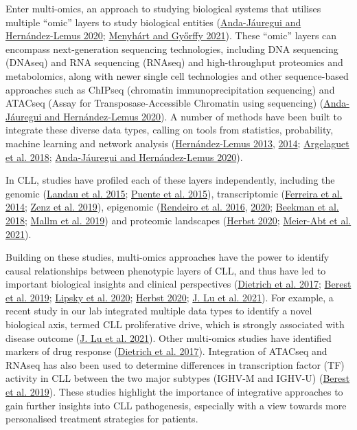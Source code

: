 \documentclass[11pt, a4paper, twosided]{book}
\begin{document}
Enter multi-omics, an approach to studying biological systems that utilises multiple ``omic'' layers to study biological entities (\protect\hyperlink{ref-Anda2020}{Anda-Jáuregui and Hernández-Lemus 2020}; \protect\hyperlink{ref-Menyhart2021}{Menyhárt and Győrffy 2021}). These ``omic'' layers can encompass next-generation sequencing technologies, including DNA sequencing (DNAseq) and RNA sequencing (RNAseq) and high-throughput proteomics and metabolomics, along with newer single cell technologies and other sequence-based approaches such as ChIPseq (chromatin immunoprecipitation sequencing) and ATACseq (Assay for Transposase-Accessible Chromatin using sequencing) (\protect\hyperlink{ref-Anda2020}{Anda-Jáuregui and Hernández-Lemus 2020}). A number of methods have been built to integrate these diverse data types, calling on tools from statistics, probability, machine learning and network analysis (\protect\hyperlink{ref-Hernandez2013}{Hernández-Lemus 2013}, \protect\hyperlink{ref-Hernandez2014}{2014}; \protect\hyperlink{ref-Argelaguet2018}{Argelaguet et al. 2018}; \protect\hyperlink{ref-Anda2020}{Anda-Jáuregui and Hernández-Lemus 2020}).

In CLL, studies have profiled each of these layers independently, including the genomic (\protect\hyperlink{ref-Landau2015}{Landau et al. 2015}; \protect\hyperlink{ref-Puente2015}{Puente et al. 2015}), transcriptomic (\protect\hyperlink{ref-Ferreira2014}{Ferreira et al. 2014}; \protect\hyperlink{ref-Zenz2019}{Zenz et al. 2019}), epigenomic (\protect\hyperlink{ref-Rendeiro2016}{Rendeiro et al. 2016}, \protect\hyperlink{ref-Rendeiro2020}{2020}; \protect\hyperlink{ref-Beekman2018}{Beekman et al. 2018}; \protect\hyperlink{ref-Mallm2019}{Mallm et al. 2019}) and proteomic landscapes (\protect\hyperlink{ref-HerbstThesis}{Herbst 2020}; \protect\hyperlink{ref-MeierAbt2021}{Meier-Abt et al. 2021}).

Building on these studies, multi-omics approaches have the power to identify causal relationships between phenotypic layers of CLL, and thus have led to important biological insights and clinical perspectives (\protect\hyperlink{ref-JCIpaper}{Dietrich et al. 2017}; \protect\hyperlink{ref-Berest2019}{Berest et al. 2019}; \protect\hyperlink{ref-Lipsky2020}{Lipsky et al. 2020}; \protect\hyperlink{ref-HerbstThesis}{Herbst 2020}; \protect\hyperlink{ref-Lu2021}{J. Lu et al. 2021}). For example, a recent study in our lab integrated multiple data types to identify a novel biological axis, termed CLL proliferative drive, which is strongly associated with disease outcome (\protect\hyperlink{ref-Lu2021}{J. Lu et al. 2021}). Other multi-omics studies have identified markers of drug response (\protect\hyperlink{ref-JCIpaper}{Dietrich et al. 2017}). Integration of ATACseq and RNAseq has also been used to determine differences in transcription factor (TF) activity in CLL between the two major subtypes (IGHV-M and IGHV-U) (\protect\hyperlink{ref-Berest2019}{Berest et al. 2019}). These studies highlight the importance of integrative approaches to gain further insights into CLL pathogenesis, especially with a view towards more personalised treatment strategies for patients.
\end{document}
